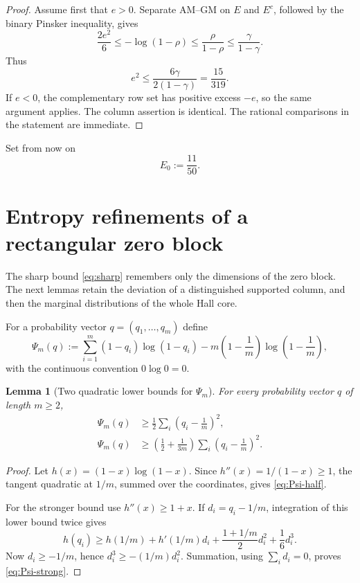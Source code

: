 \documentclass[11pt]{article}
\newtheorem{lemma}[theorem]{Lemma}
\theoremstyle{definition}
\newcommand{\g}{\gamma}
\begin{document}
\begin{proof}
Assume first that $e>0$.  Separate AM--GM on $E$ and $E^c$, followed by the
binary Pinsker inequality, gives
\[
 \frac{2e^2}{6}
 \le -\log(1-\rho)
 \le\frac{\rho}{1-\rho}
 \le\frac{\g}{1-\g}.
\]
Thus
\[
 e^2\le\frac{6\g}{2(1-\g)}=\frac{15}{319}.
\]
If $e<0$, the complementary row set has positive excess $-e$, so the same
argument applies.  The column assertion is identical.  The rational
comparisons in the statement are immediate.
\end{proof}

Set from now on
\begin{equation}\label{eq:E}
 E_0:=\frac{11}{50}.
\end{equation}

\section{Entropy refinements of a rectangular zero block}

The sharp bound \eqref{eq:sharp} remembers only the dimensions of the zero
block.  The next lemmas retain the deviation of a distinguished supported
column, and then the marginal distributions of the whole Hall core.

For a probability vector $q=(q_1,\ldots,q_m)$ define
\begin{equation}\label{eq:Psi}
 \Psi_m(q):=
 \sum_{i=1}^m(1-q_i)\log(1-q_i)
 -m\left(1-\frac1m\right)\log\left(1-\frac1m\right),
\end{equation}
with the continuous convention $0\log0=0$.

\begin{lemma}[Two quadratic lower bounds for $\Psi_m$]\label{lem:Psi}
For every probability vector $q$ of length $m\ge2$,
\begin{align}
 \Psi_m(q)&\ge\frac12\sum_i\left(q_i-\frac1m\right)^2,
 \label{eq:Psi-half}\\
 \Psi_m(q)&\ge\left(\frac12+\frac1{3m}\right)
 \sum_i\left(q_i-\frac1m\right)^2.
 \label{eq:Psi-strong}
\end{align}
\end{lemma}

\begin{proof}
Let $h(x)=(1-x)\log(1-x)$.  Since $h''(x)=1/(1-x)\ge1$,
the tangent quadratic at $1/m$, summed over the coordinates, gives
\eqref{eq:Psi-half}.

For the stronger bound use $h''(x)\ge1+x$.  If $d_i=q_i-1/m$, integration of
this lower bound twice gives
\[
 h(q_i)\ge h(1/m)+h'(1/m)d_i
 +\frac{1+1/m}{2}d_i^2+\frac16d_i^3.
\]
Now $d_i\ge-1/m$, hence $d_i^3\ge-(1/m)d_i^2$.  Summation, using
$\sum_i d_i=0$, proves \eqref{eq:Psi-strong}.
\end{proof}
\end{document}
